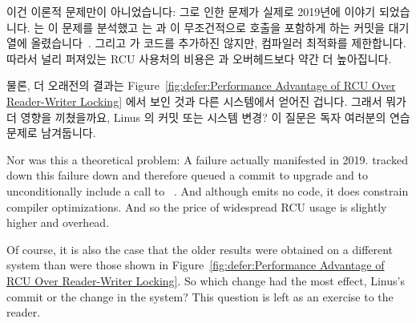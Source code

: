 {{	

	이건 이론적 문제만이 아니었습니다:
	그로 인한 문제가 실제로 2019년에 이야기 되었습니다.
	 는 이 문제를 분석했고  는
	 과  이 무조건적으로
	 호출을 포함하게 하는 커밋을 대기열에
	올렸습니다~\cite{LinusTorvalds2019:RCUreader.barrier}.
	그리고  가 코드를 추가하진 않지만, 컴파일러 최적화를
	제한합니다.
	따라서 널리 퍼져있는 RCU 사용처의 비용은  과
	 오버헤드보다 약간 더 높아집니다.

	물론, 더 오래전의 결과는
	Figure~\ref{fig:defer:Performance Advantage of RCU Over Reader-Writer Locking}
	에서 보인 것과 다른 시스템에서 얻어진 겁니다.
	그래서 뭐가 더 영향을 끼쳤을까요, Linus 의 커밋 또는 시스템 변경?
	이 질문은 독자 여러분의 연습문제로 남겨둡니다.

	\iffalse

	Nor was this a theoretical problem:
	A failure actually manifested in 2019.
	 tracked down this failure down and
	therefore queued a commit to upgrade  and
	 to unconditionally include a call to
	~\cite{LinusTorvalds2019:RCUreader.barrier}.
	And although  emits no code, it does constrain
	compiler optimizations.
	And so the price of widespread RCU usage is slightly higher
	 and  overhead.

	Of course, it is also the case that the older results were obtained
	on a different system than were those shown in
	Figure~\ref{fig:defer:Performance Advantage of RCU Over Reader-Writer Locking}.
	So which change had the most effect, Linus's commit or the change in
	the system?
	This question is left as an exercise to the reader.

}}
